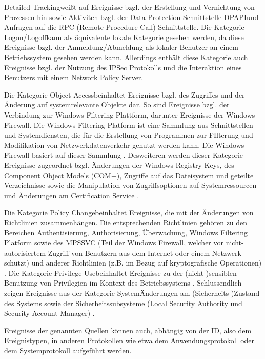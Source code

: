 \glqq Detailed Tracking\grqq  weißt auf Ereignisse bzgl. der Erstellung und Vernichtung von Prozessen hin sowie Aktiviten bzgl. der Data Protection Schnittstelle \glqq DPAPI\grqq  und Anfragen auf die RPC (Remote Procedure Call)-Schnittstelle.
Die Kategorie \glqq Logon/Logoff\grqq  kann als äquivalente lokale Kategorie gesehen werden, da diese Ereignisse bzgl. der Anmeldung/Abmeldung als lokaler Benutzer an einem Betriebssystem gesehen werden kann. Allerdings enthält diese Kategorie auch Ereignisse bzgl. der Nutzung des IPSec Protokolls und die Interaktion eines Benutzers mit einem Network Policy Server. 

Die Kategorie \glqq Object Access\grqq  beinhaltet Ereignisse bzgl. des Zugriffes und der Änderung auf systemrelevante Objekte dar. So sind Ereignisse bzgl. der Verbindung zur Windows Filtering Plattform, darunter Ereignisse der Windows Firewall. Die Windows Filtering Platform ist eine Sammlung aus Schnittstellen und Systemdiensten, die für die Erstellung von Programmen zur FIlterung und Modifikation von Netzwerkdatenverkehr genutzt werden kann. Die Windows Firewall basiert auf dieser Sammlung \citep{MS4}. 
Desweiteren werden dieser Kategorie Ereignisse zugeordnet bzgl. Änderungen der Windows Registry Keys, des Component Object Models (COM+), Zugriffe auf das Dateisystem und geteilte Verzeichnisse sowie die Manipulation von Zugriffsoptionen auf Systemressourcen und Änderungen am Certification Service \citep{MS3}. 

Die Kategorie \glqq Policy Change\grqq  beinhaltet Ereignisse, die mit der Änderungen von Richtlinien zusammenhängen. Die entsprechenden Richtlinien gehören zu den Bereichen Authentisierung, Authorisierung, Überwachung, Windows Filtering Platform sowie des MPSSVC (Teil der Windows Firewall, welcher vor nicht-autorisiertem Zugriff von Benutzern aus dem Internet oder einem Netzwerk schützt) und anderer Richtlinien (z.B. im Bezug auf kryptografische Operationen) \citep{MS5}. %
Die Kategorie \glqq Privilege Use\grqq  beinhaltet Ereignisse zu der (nicht-)sensiblen Benutzung von Privilegien im Kontext des Betriebssystems \citep{MS3}. 
Schlussendlich zeigen Ereignisse aus der Kategorie \glqq System\grqq  Änderungen am (Sicherheits-)Zustand des Systems sowie der Sicherheitssubsysteme (Local Security Authority und Security Account Manager) \citep{MS3}.

Ereignisse der genannten Quellen können auch, abhängig von der ID, also dem Ereignistypen, in anderen Protokollen wie etwa dem Anwendungsprotokoll oder dem Systemprotokoll aufgeführt werden.

